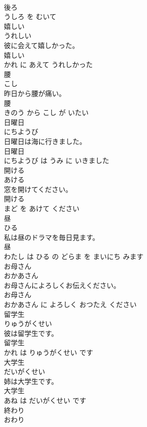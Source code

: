 \documentclass[8pt]{extreport}
\begin{document}
\begin{CJK}{UTF8}{min}
\\	後ろ 
\\	うしろ を むいて			
\\	嬉しい	
\\	うれしい			
\\	彼に会えて嬉しかった。	
\\	嬉しい 
\\	かれ に あえて うれしかった			
\\	腰	
\\	こし			
\\	昨日から腰が痛い。	
\\	腰 
\\	きのう から こし が いたい			
\\	日曜日	
\\	にちようび			
\\	日曜日は海に行きました。	
\\	日曜日 
\\	にちようび は うみ に いきました			
\\	開ける	
\\	あける			
\\	窓を開けてください。	
\\	開ける 
\\	まど を あけて ください			
\\	昼	
\\	ひる			
\\	私は昼のドラマを毎日見ます。	
\\	昼 
\\	わたし は ひる の どらま を まいにち みます			
\\	お母さん	
\\	おかあさん			
\\	お母さんによろしくお伝えください。	
\\	お母さん 
\\	おかあさん に よろしく おつたえ ください			
\\	留学生	
\\	りゅうがくせい			
\\	彼は留学生です。	
\\	留学生 
\\	かれ は りゅうがくせい です			
\\	大学生	
\\	だいがくせい			
\\	姉は大学生です。	
\\	大学生 
\\	あね は だいがくせい です			
\\	終わり	
\\	おわり			

\end{CJK}
\end{document}
